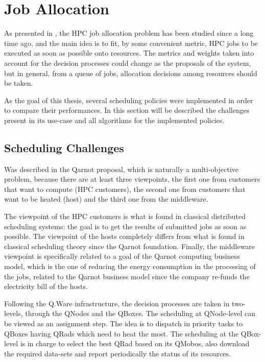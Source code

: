 \chapter{Job Allocation}
\label{sec:schedulers}

As presented in , the HPC job allocation problem has been studied since a long time ago, and the main idea is to fit, by some convenient metric, HPC jobs to be executed as soon as possible onto resources. The metrics and weights taken into account for the decision processes could change as the proposals of the system, but in general, from a queue of jobs, allocation decisions among resources should be taken. 

As the goal of this thesis, several scheduling policies were implemented in order to compare their performances. In this section will be described the challenges present in its use-case and all algorithms for the implemented policies.

\section{Scheduling Challenges}

Was described in  the Qarnot proposal, which is naturally a multi-objective problem, because there are at least three viewpoints, the first one from customers that want to compute (HPC customers), the second one from customers that want to be heated (host) and the third one from the middleware.

The viewpoint of the HPC customers is what is found in classical distributed scheduling systems: the goal is to get the results of submitted jobs as soon as possible. The viewpoint of the hosts completely differs from what is found in classical scheduling theory since the Qarnot foundation. Finally, the middleware viewpoint is specifically related to a goal of the Qarnot computing business model, which is the one of reducing the energy consumption in the processing of the jobs, related to the Qarnot business model since the company re-funds the electricity bill of the hosts. 


Following the Q.Ware infrastructure, the decision processes are taken in two-levels, through the QNodes and the QBoxes. The scheduling at QNode-level can be viewed as an assignment step. The idea is to dispatch in priority tasks to QBoxes having QRads which need to heat the most.
The scheduling at the QBox-level is in charge to select the best QRad based on its QMobos, also download the required data-sets and report periodically the status of its resources.

